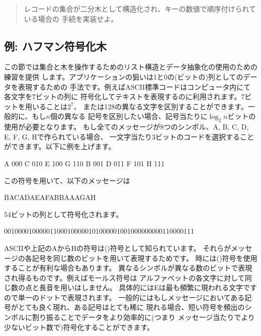 \begin{quote}
レコードの集合が二分木として構造化され、キーの数値で順序付けられている場合の
手続を実装せよ。
\end{quote}

\subsection{例: ハフマン符号化木}



この節では集合と木を操作するためのリスト構造とデータ抽象化の使用のための練習を提供
します。アプリケーションの狙いは1と0の(ビットの)列としてのデータを表現するための
手法です。例えばASCII標準コードはコンピュータ内にて各文字を7ビットの列に
符号化してテキストを表現するのに利用されます。7ビットを用いることは\( 2^7 \)、
または128の異なる文字を区別することができます。一般的に、もし\( n \)個の異なる
記号を区別したい場合、記号当たりに\( \log_2\!n \)ビットの使用が必要となります。
もし全てのメッセージが8つのシンボル、A, B, C, D, E, F, G, Hで作られている場合、
一文字当たり3ビットのコードを選択することができます。以下に例を上げます。

\begin{example}
A 000    C 010    E 100    G 110
B 001    D 011    F 101    H 111
\end{example}

\noindent
この符号を用いて、以下のメッセージは

\begin{example}
BACADAEAFABBAAAGAH
\end{example}

\noindent
54ビットの列として符号化されます。

\begin{example}
001000010000011000100000101000001001000000000110000111
\end{example}

\noindent
ASCIIや上記のAからHの符号は()符号として知られています。
それらがメッセージの各記号を同じ数のビットを用いて表現するためです。
時には()符号を使用することが有利な場合もあります。
異なるシンボルが異なる数のビットで表現され得るものです。例えばモールス符号は
アルファベットの各文字に対して同じ数の点と長音を用いはしません。
具体的にはEは最も頻繁に現われる文字ですので単一のドットで表現されます。
一般的にはもしメッセージにおいてある記号がとても良く現れ、ある記号はとても稀に
現れる場合、短い符号を頻出のシンボルに割り振ることでデータをより効率的に(つまり
メッセージ当たりでより少ないビット数で)符号化することができます。

